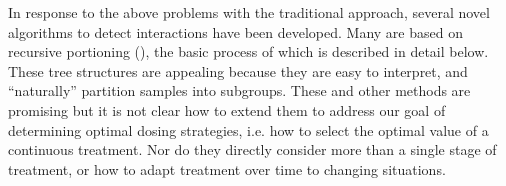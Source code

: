 \documentclass[12pt]{article}
\begin{document}
In response to the above problems with the traditional approach, several novel algorithms to detect interactions have been developed. Many are based on recursive portioning (\cite{Doove2013}), the basic process of which is described in detail below. These tree structures are appealing because they are easy to interpret, and ``naturally'' partition samples into subgroups. These and other methods are promising but it is not clear how to extend them to address our goal of determining optimal dosing strategies, i.e. how to select the optimal value of a continuous treatment. Nor do they directly consider more than a single stage of treatment, or how to adapt treatment over time to changing situations.


%




%
%
%
%
\end{document}
